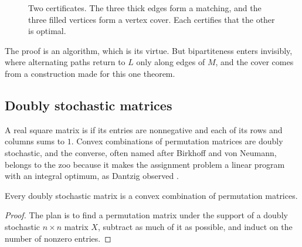 \begin{refsection}
\begin{figure}[t]
\centering
{}
\caption{Two certificates. The three thick edges form a matching, and the three filled vertices form a vertex cover. Each certifies that the other is optimal.}\label{fig:lpduality:konig}
\end{figure}

The proof is an algorithm, which is its virtue. But bipartiteness enters invisibly, where alternating paths return to $L$ only along edges of $M$, and the cover comes from a construction made for this one theorem.

\subsection{Doubly stochastic matrices}

A real square matrix is  if its entries are nonnegative and each of its rows and columns sums to $1$. Convex combinations of permutation matrices are doubly stochastic, and the converse, often named after Birkhoff and von Neumann, belongs to the zoo because it makes the assignment problem a linear program with an integral optimum, as Dantzig observed \parencite{Schrijver2005}.

\begin{theorem}\label{thm:lpduality:bvn}
Every doubly stochastic matrix is a convex combination of permutation matrices.
\end{theorem}

\begin{proof}
The plan is to find a permutation matrix under the support of a doubly stochastic $n\times n$ matrix $X$, subtract as much of it as possible, and induct on the number of nonzero entries.


\end{proof}
\end{refsection}
